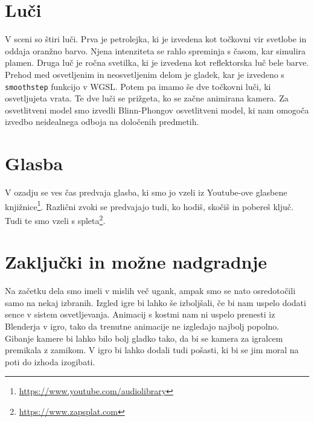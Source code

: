 \documentclass[a4paper,12pt]{article}
\begin{document}
\newpage

\section{Luči}
V sceni so štiri luči. Prva je petrolejka, ki je izvedena kot točkovni vir svetlobe in oddaja oranžno barvo. Njena intenziteta se rahlo spreminja s časom, kar simulira plamen. Druga luč je ročna svetilka, ki je izvedena kot reflektorska luč bele barve. Prehod med osvetljenim in neosvetljenim delom je gladek, kar je izvedeno s \verb+smoothstep+ funkcijo v WGSL. Potem pa imamo še dve točkovni luči, ki osvetljujeta vrata. Te dve luči se prižgeta, ko se začne animirana kamera.
Za osvetlitveni model smo izvedli Blinn-Phongov osvetlitveni model, ki nam omogoča izvedbo neidealnega odboja na določenih predmetih.

\section{Glasba}
V ozadju se ves čas predvaja glasba, ki smo jo vzeli iz Youtube-ove glasbene knjižnice\footnote{\url{https://www.youtube.com/audiolibrary}}. Različni zvoki se predvajajo tudi, ko hodiš, skočiš in pobereš ključ. Tudi te smo vzeli s spleta\footnote{\url{https://www.zapsplat.com}}.

\section{Zaključki in možne nadgradnje}
Na začetku dela smo imeli v mislih več ugank, ampak smo se nato osredotočili samo na nekaj izbranih. Izgled igre bi lahko še izboljšali, če bi nam uspelo dodati sence v sistem osvetljevanja. Animacij s kostmi nam ni uspelo prenesti iz Blenderja v igro, tako da trenutne animacije ne izgledajo najbolj popolno. Gibanje kamere bi lahko bilo bolj gladko tako, da bi se kamera za igralcem premikala z zamikom. V igro bi lahko dodali tudi pošasti, ki bi se jim moral na poti do izhoda izogibati.
\end{document}
